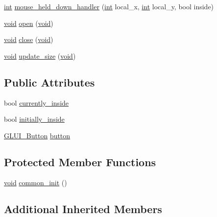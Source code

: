 \begin{DoxyCompactItemize}
\item 
\hyperlink{wglext_8h_a500a82aecba06f4550f6849b8099ca21}{int} \hyperlink{class_g_l_u_i___rollout_a55eb4c45f7857bbae04e857aadf2b505}{mouse\+\_\+held\+\_\+down\+\_\+handler} (\hyperlink{wglext_8h_a500a82aecba06f4550f6849b8099ca21}{int} local\+\_\+x, \hyperlink{wglext_8h_a500a82aecba06f4550f6849b8099ca21}{int} local\+\_\+y, bool inside)
\item 
\hyperlink{wglext_8h_a9e6b7f1933461ef318bb000d6bd13b83}{void} \hyperlink{class_g_l_u_i___rollout_a431c2fee6adb56c18d0ed8ac9a01eacb}{open} (\hyperlink{wglext_8h_a9e6b7f1933461ef318bb000d6bd13b83}{void})
\item 
\hyperlink{wglext_8h_a9e6b7f1933461ef318bb000d6bd13b83}{void} \hyperlink{class_g_l_u_i___rollout_a16ff61e6541e9872fc82f91c75263e16}{close} (\hyperlink{wglext_8h_a9e6b7f1933461ef318bb000d6bd13b83}{void})
\item 
\hyperlink{wglext_8h_a9e6b7f1933461ef318bb000d6bd13b83}{void} \hyperlink{class_g_l_u_i___rollout_af6f664a8ca31757bc1e5926d5eaf2827}{update\+\_\+size} (\hyperlink{wglext_8h_a9e6b7f1933461ef318bb000d6bd13b83}{void})
\end{DoxyCompactItemize}
\subsection*{Public Attributes}
\begin{DoxyCompactItemize}
\item 
bool \hyperlink{class_g_l_u_i___rollout_aa9896aa7e1ee76ac8b4d84573da7e6fb}{currently\+\_\+inside}
\item 
bool \hyperlink{class_g_l_u_i___rollout_ad9d35f15e7df49dc27fdc5ab571e0e17}{initially\+\_\+inside}
\item 
\hyperlink{class_g_l_u_i___button}{G\+L\+U\+I\+\_\+\+Button} \hyperlink{class_g_l_u_i___rollout_a552827a8d2ff58920457b8637b9536b0}{button}
\end{DoxyCompactItemize}
\subsection*{Protected Member Functions}
\begin{DoxyCompactItemize}
\item 
\hyperlink{wglext_8h_a9e6b7f1933461ef318bb000d6bd13b83}{void} \hyperlink{class_g_l_u_i___rollout_aaf1aa792f0fd5a90822e13ecd2797736}{common\+\_\+init} ()
\end{DoxyCompactItemize}
\subsection*{Additional Inherited Members}


